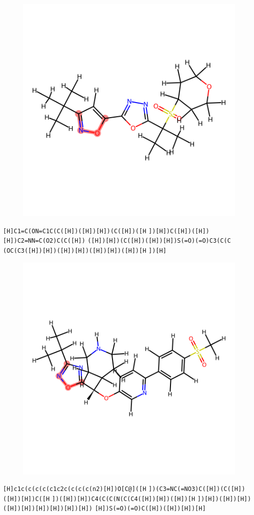 \documentclass{article}
\begin{document}
\begin{figure}[ht]
\centering
    \includegraphics{mol250.png}
\end{figure}
\verb|[H]C1=C(ON=C1C(C([H])([H])[H])(C([H])([H| \verb|])[H])C([H])([H])[H])C2=NN=C(O2)C(C([H])| \verb|([H])[H])(C([H])([H])[H])S(=O)(=O)C3(C(C| \verb|(OC(C3([H])[H])([H])[H])([H])[H])([H])[H| \verb|])[H]|

\begin{figure}[ht]
\centering
    \includegraphics{mol251.png}
\end{figure}
\verb|[H]c1c(c(c(c(c1c2c(c(c(c(n2)[H])O[C@]([H| \verb|])(C3=NC(=NO3)C([H])(C([H])([H])[H])C([H| \verb|])([H])[H])C4(C(C(N(C(C4([H])[H])([H])[H| \verb|])[H])([H])[H])([H])[H])[H])[H])[H])[H])| \verb|[H])S(=O)(=O)C([H])([H])[H])[H]|
\end{document}

